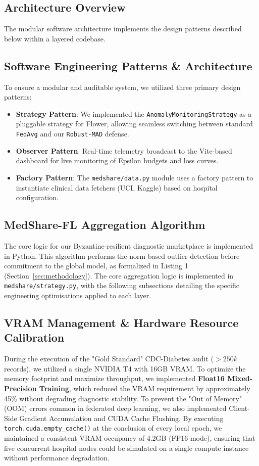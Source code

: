 \documentclass[10pt, a4paper, twocolumn]{article}
\begin{document}
\subsection{Architecture Overview}
The modular software architecture implements the design patterns described below within a layered codebase.

\subsection{Software Engineering Patterns \& Architecture}
To ensure a modular and auditable system, we utilized three primary design patterns:
\begin{itemize}
    \item \textbf{Strategy Pattern}: We implemented the \texttt{AnomalyMonitoringStrategy} as a pluggable strategy for Flower, allowing seamless switching between standard \texttt{FedAvg} and our \texttt{Robust-MAD} defense.
    \item \textbf{Observer Pattern}: Real-time telemetry broadcast to the Vite-based dashboard for live monitoring of Epsilon budgets and loss curves.
    \item \textbf{Factory Pattern}: The \texttt{medshare/data.py} module uses a factory pattern to instantiate clinical data fetchers (UCI, Kaggle) based on hospital configuration.
\end{itemize}

\subsection{MedShare-FL Aggregation Algorithm}
The core logic for our Byzantine-resilient diagnostic marketplace is implemented in Python. This algorithm performs the norm-based outlier detection before commitment to the global model, as formalized in Listing 1 (Section~\ref{sec:methodology}). The core aggregation logic is implemented in \texttt{medshare/strategy.py}, with the following subsections detailing the specific engineering optimisations applied to each layer.

\subsection{VRAM Management \& Hardware Resource Calibration}
During the execution of the "Gold Standard" CDC-Diabetes audit ($>250k$ records), we utilized a single NVIDIA T4 with 16GB VRAM. To optimize the memory footprint and maximize throughput, we implemented \textbf{Float16 Mixed-Precision Training}, which reduced the VRAM requirement by approximately 45\% without degrading diagnostic stability. To prevent the "Out of Memory" (OOM) errors common in federated deep learning, we also implemented Client-Side Gradient Accumulation and CUDA Cache Flushing. By executing \texttt{torch.cuda.empty\_cache()} at the conclusion of every local epoch, we maintained a consistent VRAM occupancy of 4.2GB (FP16 mode), ensuring that five concurrent hospital nodes could be simulated on a single compute instance without performance degradation.
\end{document}
